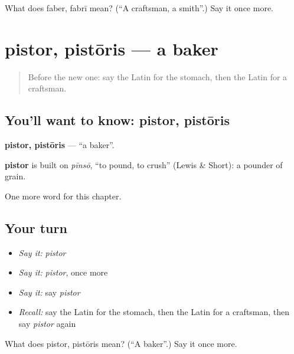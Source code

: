 \begin{tcolorbox}[breakable,colback=teal!4,colframe=teal!35!black,title={Before you move on}]
What does faber, fabrī mean? (\textquotedblleft{}A craftsman, a smith\textquotedblright{}.) Say it once more.
\end{tcolorbox}
\section[pistor, pistōris]{pistor, pistōris — a baker}

\label{lesson:LA-C137-pistor}



\begin{quote}
Before the new one: say the Latin for the stomach, then the Latin for a craftsman.
\end{quote}

\subsection*{You'll want to know: pistor, pistōris}
\textbf{pistor, pistōris} — \textquotedblleft{}a baker\textquotedblright{}.

\begin{cousinweb}
\textbf{pistor} is built on \emph{pīnsō}, \textquotedblleft{}to pound, to crush\textquotedblright{} (Lewis \& Short): a pounder of grain.
\end{cousinweb}

\begin{grammarlens}[title={What you've built}]
One more word for this chapter.
\end{grammarlens}

\subsection*{Your turn}
\begin{itemize}
\raggedright
  \item \emph{Say it:} \emph{pistor}
  \item \emph{Say it:} \emph{pistor}, once more
  \item \emph{Say it:} say \emph{pistor}
  \item \emph{Recall:} say the Latin for the stomach, then the Latin for a craftsman, then say \emph{pistor} again
\end{itemize}

\begin{tcolorbox}[breakable,colback=teal!4,colframe=teal!35!black,title={Before you move on}]
What does pistor, pistōris mean? (\textquotedblleft{}A baker\textquotedblright{}.) Say it once more.
\end{tcolorbox}

